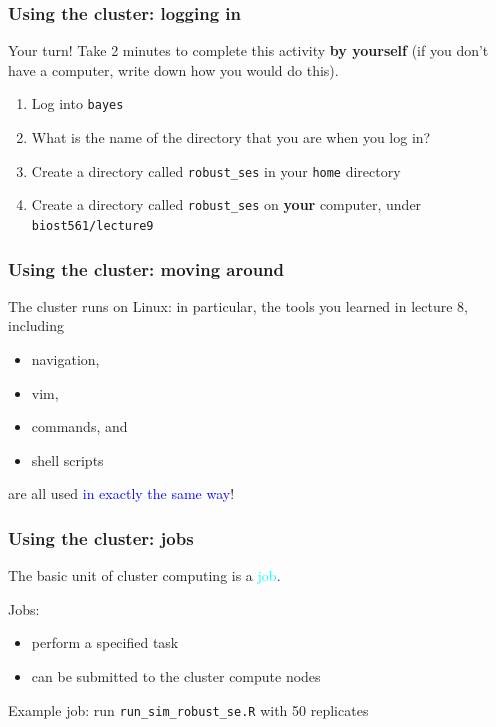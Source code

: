 \documentclass[12pt, 
hyperref={colorlinks=true, linkcolor=BlueViolet, urlcolor=BlueViolet},dvipsnames]{beamer}
\begin{document}
\begin{frame}
\frametitle{Using the cluster: logging in}
Your turn! Take 2 minutes to complete this activity \textbf{by yourself} (if you don't have a computer, write down how you would do this).
\begin{enumerate}
\item Log into \texttt{bayes}
\item What is the name of the directory that you are when you log in?
\item Create a directory called \texttt{robust\_ses} in your \texttt{home} directory
\item Create a directory called \texttt{robust\_ses} on \textbf{your} computer, under \texttt{biost561/lecture9}
\end{enumerate}
\end{frame}

\begin{frame}
\frametitle{Using the cluster: moving around}
The cluster runs on Linux: in particular, the tools you learned in lecture 8, including \vspace{-0.3cm} \pause
\begin{itemize}
\item navigation, \pause
\item vim, \pause
\item commands, \pause and
\item shell scripts
\end{itemize}
are all used \textcolor{blue}{in exactly the same way}!
\end{frame}

\begin{frame}
\frametitle{Using the cluster: jobs}
The basic unit of cluster computing is a \textcolor{cyan}{job}. \pause

Jobs: \vspace{-0.3cm} \pause
\begin{itemize}
\item perform a specified task \pause
\item can be submitted to the cluster compute nodes \pause
\end{itemize}

Example job: run \texttt{run\_sim\_robust\_se.R} with 50 replicates
\end{frame}
\end{document}

